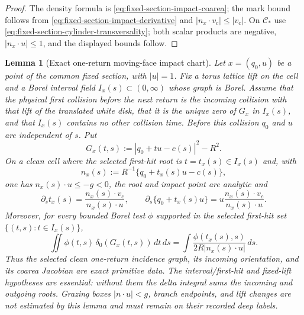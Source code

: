 \documentclass[11pt]{article}
\newtheorem{lemma}[theorem]{Lemma}
\begin{document}
\begin{proof}
The density formula is \eqref{eq:fixed-section-impact-coarea}; the mark bound
follows from \eqref{eq:fixed-section-impact-derivative} and
$|n_x\cdot v_c|\le |v_c|$.
On $\mathcal C_*$ use
\eqref{eq:fixed-section-cylinder-transversality}; both scalar products are
negative, $|n_x\cdot u|\le1$, and the displayed bounds follow.
\end{proof}

\begin{lemma}[Exact one-return moving-face impact chart]
\label{lem:fixed-section-impact-coarea}
Let $x=(q_0,u)$ be a point of the common fixed section, with $|u|=1$.  Fix a
torus lattice lift on the cell and a Borel interval field
$I_x(s)\subset(0,\infty)$ whose graph is Borel.  Assume that the physical
first collision before the next return is the incoming collision with that
lift of the translated white disk, that it is the unique zero of $G_x$ in
$I_x(s)$, and that $I_x(s)$ contains no other collision time.  Before this
collision $q_0$ and $u$ are independent of $s$.  Put
\begin{equation}
 G_x(t,s):=|q_0+tu-c(s)|^2-R^2.
\label{eq:fixed-section-impact-equation}
\end{equation}
On a clean cell where the selected first-hit root is $t=t_x(s)\in I_x(s)$ and, with
\[
 n_x(s):=R^{-1}\{q_0+t_x(s)u-c(s)\},
\]
one has $n_x(s)\cdot u\le-g<0$, the root and impact point are analytic and
\begin{equation}
 \partial_st_x(s)=
 \frac{n_x(s)\cdot v_c}{n_x(s)\cdot u},
 \qquad
 \partial_s\{q_0+t_x(s)u\}
 =u\frac{n_x(s)\cdot v_c}{n_x(s)\cdot u}.
\label{eq:fixed-section-impact-derivative}
\end{equation}
Moreover, for every bounded Borel test $\phi$ supported in the selected
first-hit set $\{(t,s):t\in I_x(s)\}$,
\begin{equation}
 \iint \phi(t,s)\,\delta_0(G_x(t,s))\,dt\,ds
 =
 \int
 \frac{\phi(t_x(s),s)}
 {2R|n_x(s)\cdot u|}\,ds.
\label{eq:fixed-section-impact-coarea}
\end{equation}
Thus the selected clean one-return incidence graph, its incoming orientation,
and its coarea Jacobian are exact primitive data.  The interval/first-hit and
fixed-lift hypotheses are essential: without them the delta integral sums the
incoming and outgoing roots.  Grazing boxes $|n\cdot u|<g$, branch endpoints,
and lift changes are not estimated by this lemma and must remain on their
recorded deep labels.
\end{lemma}
\end{document}
